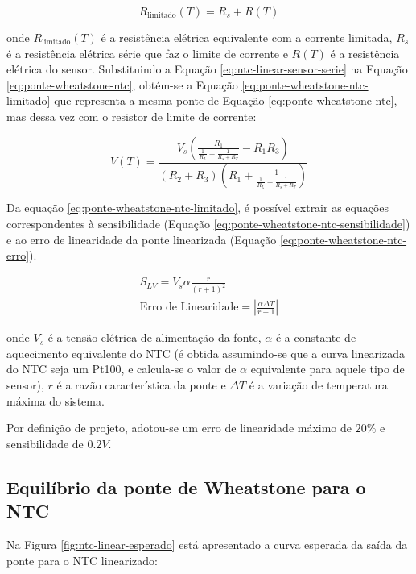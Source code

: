 \documentclass[a4paper]{instrumentacao}
\begin{document}
\begin{equation}
	R_{\text{limitado}}(T) = R_s + R(T)
	\label{eq:ntc-linear-sensor-serie}
\end{equation}

\noindent onde $R_{\text{limitado}}(T)$ é a resistência elétrica equivalente com a corrente limitada, $R_s$ é a resistência elétrica série que faz o limite de corrente e $R(T)$ é a resistência elétrica do sensor. Substituindo a Equação \ref{eq:ntc-linear-sensor-serie} na Equação \ref{eq:ponte-wheatstone-ntc}, obtém-se a Equação \ref{eq:ponte-wheatstone-ntc-limitado} que representa a mesma ponte de Equação \ref{eq:ponte-wheatstone-ntc}, mas dessa vez com o resistor de limite de corrente:

\begin{equation}
	V(T) = \frac{V_s \left(\frac{R_1}{\frac{1}{R_L}+\frac{1}{R_s+R_T}}-R_1 R_3\right)}{(R_2+R_3) \left(R_1+\frac{1}{\frac{1}{R_L}+\frac{1}{R_s+R_T}}\right)}
	\label{eq:ponte-wheatstone-ntc-limitado}
\end{equation}

Da equação \ref{eq:ponte-wheatstone-ntc-limitado}, é possível extrair as equações correspondentes à sensibilidade (Equação \ref{eq:ponte-wheatstone-ntc-sensibilidade}) e ao erro de linearidade da ponte linearizada  (Equação \ref{eq:ponte-wheatstone-ntc-erro}).

\begin{eqnarray}
	S_{LV} = V_s \alpha \frac{r}{(r+1)^2}	 \label{eq:ponte-wheatstone-ntc-sensibilidade} \\
	\text{Erro de Linearidade} = \left|\frac{\alpha \Delta T}{r+1}\right|			   \label{eq:ponte-wheatstone-ntc-erro}
\end{eqnarray}

\noindent onde $V_s$ é a tensão elétrica de alimentação da fonte, $\alpha$ é a constante de aquecimento equivalente do NTC (é obtida assumindo-se que a curva linearizada do NTC seja um Pt100, e calcula-se o valor de $\alpha$ equivalente para aquele tipo de sensor), $r$ é a razão característica da ponte e $\Delta T$ é a variação de temperatura máxima do sistema.

Por definição de projeto, adotou-se um erro de linearidade máximo de $20\%$ e sensibilidade de $0.2 V$. 

\subsection{Equilíbrio da ponte de Wheatstone para o NTC}
Na Figura \ref{fig:ntc-linear-esperado} está apresentado a curva esperada da saída da ponte para o NTC linearizado:
\end{document}
